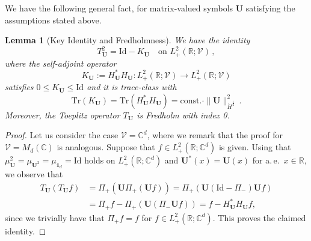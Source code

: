 \documentclass[11pt,reqno]{amsart}
\newtheorem{lem}{Lemma}[section]
\theoremstyle{definition}
\theoremstyle{remark}
\theoremstyle{remark}
\numberwithin{equation}{section}
\newcommand{\C}{\mathbb{C}}
\newcommand{\R}{\mathbb{R}}
\newcommand{\VV}{\mathcal{V}}
\newcommand{\Ub}{\mathbf{U}}
\newcommand{\id}{\mathrm{Id}}
\newcommand{\Tr}{\mathrm{Tr}}
\begin{document}
We have the following general fact, for matrix-valued symbols $\Ub$ satisfying the assumptions stated above.

\begin{lem}[Key Identity and Fredholmness] \label{lem:key} We have the identity
$$
T_{\Ub}^2 = \id - K_{\Ub} \quad \mbox{on $L^2_+(\R; \VV)$} \, ,
$$
where the self-adjoint operator 
$$
K_\Ub := H^*_{\Ub} H_{\Ub} : L^2_+(\R; \VV) \to L^2_+(\R; \VV)
$$
satisfies $0 \leq K_{\Ub} \leq \id$ and it is trace-class with 
$$
\Tr(K_\Ub) = \Tr(H^*_\Ub H_\Ub) = \mathrm{const.} \cdot \| \Ub \|_{\dot{H}^{\frac 1 2}}^2  \, .
$$
Moreover, the Toeplitz operator $T_{\Ub}$ is Fredholm with index 0.
\end{lem}

\begin{proof}
Let us consider the case $\VV= \C^d$, where we remark that the proof for $\VV = M_d(\C)$ is analogous. Suppose that $f \in L^2_+(\R; \C^d)$ is given. Using that $\mu_\Ub^2 = \mu_{\Ub^2} = \mu_{\mathds{1}_d} = \id$ holds on $L^2_+(\R; \C^d)$ and $\Ub^*(x)=\Ub(x)$ for a.\,e.~$x \in \R$, we observe that
\begin{align*}
T_\Ub ( T_\Ub f) & = \Pi_+(\Ub \Pi_+(\Ub f)) = \Pi_+ ({\Ub} (\id - \Pi_-) \Ub f) \\ 
& = \Pi_+ f - \Pi_+ ( {\Ub} (\Pi_- \Ub f) ) = f - H_{\Ub}^* H_\Ub f,
\end{align*}
since we trivially have that $\Pi_+ f = f$ for $f \in L^2_+(\R; \C^d)$. This proves the claimed identity.


\end{proof}
\end{document}
